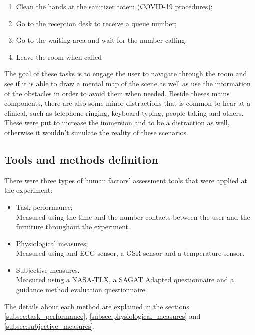         \begin{enumerate}
            \item Clean the hands at the sanitizer totem (COVID-19 procedures);
            \item Go to the reception desk to receive a queue number;
            \item Go to the waiting area and wait for the number calling;
            \item Leave the room when called \label{itm:n_tasks}
        \end{enumerate}
        
        
        
        The goal of these tasks is to engage the user to navigate through the room and see if it is able to draw a mental map of the scene as well as use the information of the obstacles in order to avoid them when needed. Beside theses mains components, there are also some minor distractions that is common to hear at a clinical, such as telephone ringing, keyboard typing, people taking and others. These were put to increase the immersion and to be a distraction as well, otherwise it wouldn't simulate the reality of these scenarios.
    
    \subsection{Tools and methods definition}
        There were three types of human factors' assessment tools that were applied at the experiment:
        \begin{itemize}
            \item Task performance; \\  Measured using the time and the number contacts between the user and the furniture throughout the experiment.
            \item Physiological measures; \\ Measured using and ECG sensor, a GSR sensor and a temperature sensor.
            \item Subjective measures. \\ Measured using a NASA-TLX, a SAGAT Adapted questionnaire and a guidance method evaluation questionnaire.
        \end{itemize}
        The details about each method are explained in the sections \ref{subsec:task_performance}, \ref{subsec:physiological_measures} and \ref{subsec:subjective_measures}.
        
